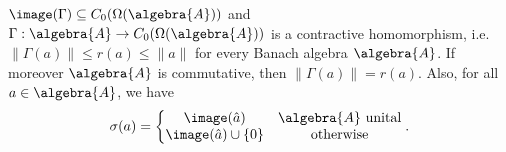 \documentclass[a4paper]{article}
\begin{document}
\begin{theorem}
	$\image(\Gamma) \subseteq C_0(\Omega(\algebra{A}))$ and $\Gamma: \algebra{A} \to C_0(\Omega(\algebra{A}))$ is a contractive homomorphism, i.e. $\|\Gamma(a) \| \leq r(a) \leq \|a\|$ for every Banach algebra $\algebra{A}$.
	If moreover $\algebra{A}$ is commutative, then $\|\Gamma(a)\| = r(a)$.
	Also, for all $a \in \algebra{A}$, we have
	\begin{equation*}
		\sigma(a) = \left\{ \begin{matrix}
			\image(\hat a)            & \algebra{A} \text{ unital} \\
			\image(\hat a) \cup \{0\} & \text{otherwise}
		\end{matrix}  \right. \text{.}
	\end{equation*}
\end{theorem}
\end{document}
